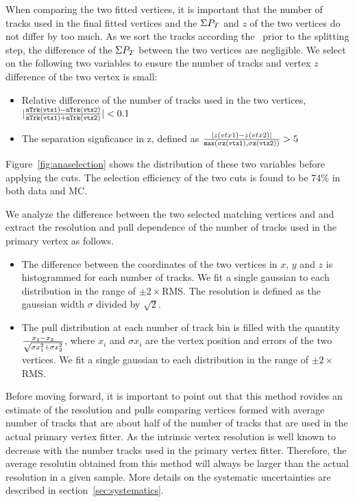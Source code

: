 \begin{enumerate}
When comparing the two fitted vertices, it is important that 
the number of tracks used in the final fitted vertices and the 
$\Sigma P_T$ and $z$ of the two vertices do not differ by too much. 
As we sort the tracks according the \pt\, prior to the splitting 
step, the difference of the $\Sigma P_T$ between the two vertices 
are negligible. We select on the following two variables to ensure the 
number of tracks and vertex $z$ difference of the two vertex is small:
\begin{itemize}
\item Relative difference of the number of tracks used in the two vertices, 
$|\frac{\tt{nTrk(vtx1)-nTrk(vtx2)}}{\tt{nTrk(vtx1)+nTrk(vtx2)}}|<0.1$
\item The separation signficance in z, defined as 
$\frac{|z(vtx1)-z(vtx2)|}{\tt{max}(\sigma z(vtx1),\sigma z(vtx2))}>5$
\end{itemize}
Figure~\ref{fig:anaselection} shows the distribution of these 
two variables before applying the cuts. The selection efficiency of the two 
cuts is found to be 74\% in both data and MC. 

We analyze the difference between the two selected matching vertices and 
and extract the resolution and pull dependence of the number of tracks 
used in the primary vertex as follows. 
\begin{itemize}
\item
The difference between the coordinates of the two vertices in $x$, $y$ 
and $z$ is histogrammed for each number of tracks. We fit a single 
gaussian to each distribution in the range of $\pm2\times$RMS. 
The resolution is defined as the gaussian width $\sigma$ divided by $\sqrt{2}$.
\item
The pull distribution at each number of track bin is filled with the 
quantity ${x_1-x_2}\over\sqrt{\sigma x_1^2+\sigma x_2^2}$, where 
$x_i$ and $\sigma x_i$ are the vertex position and errors of the two vertices.
We fit a single gaussian to each distribution in the range of $\pm2\times$RMS.
\end{itemize}
\end{enumerate}

Before moving forward, it is important to point out that this method rovides an estimate 
of the resolution and pulls comparing vertices formed 
with average number of tracks that are about half of the number of tracks 
that are used in the actual primary vertex fitter. 
As the intrinsic vertex resolution is well known to decrease with the 
number tracks used in the primary vertex fitter. Therefore, the average 
resolutin obtained from this method will always be larger than the actual 
resolution in a given sample. More details on the systematic uncertainties 
are described in section~\ref{sec:systematics}.

